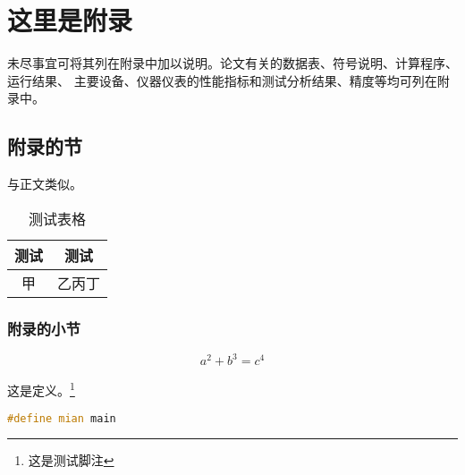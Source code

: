 \chapter{这里是附录}\label{app:1}
未尽事宜可将其列在附录中加以说明。论文有关的数据表、符号说明、计算程序、运行结果、
主要设备、仪器仪表的性能指标和测试分析结果、精度等均可列在附录中。
\section{附录的节}
与正文类似。
\begin{table}[ht]
	\centering
	\caption{测试表格}\label{tab:mytable}
	\begin{tabular}{cc}
		\toprule
		测试 & 测试   \\
		\midrule
		甲   & 乙丙丁 \\
		\bottomrule
	\end{tabular}
\end{table}

\subsection{附录的小节}


\begin{equation}
	a^2+b^3=c^4
\end{equation}

\begin{definition}
	这是定义。\footnote{这是测试脚注}
\end{definition}

\begin{lstlisting}[language=c++,caption=一个测试,label=mycode]
#define mian main
	\end{lstlisting}

